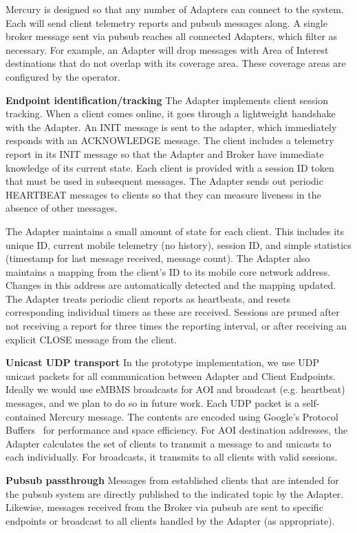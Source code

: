 Mercury is designed so that any number of Adapters can connect to the
\pubsub system. Each will send client telemetry reports and pubsub
messages along. A single broker message sent via pubsub reaches all
connected Adapters, which filter as necessary. For example, an Adapter
will drop messages with Area of Interest destinations that do not
overlap with its coverage area. These coverage areas are configured by
the operator.
  
\textbf{Endpoint identification/tracking} The Adapter implements
client session tracking. When a client comes online, it goes through a
lightweight handshake with the Adapter. An INIT message is sent to the
adapter, which immediately responds with an ACKNOWLEDGE message. The
client includes a telemetry report in its INIT message so that the
Adapter and Broker have immediate knowledge of its current state. Each
client is provided with a session ID token that must be used in
subsequent messages.  The Adapter sends out periodic HEARTBEAT
messages to clients so that they can measure liveness in the absence
of other messages.

The Adapter maintains a small amount of state for each client. This
includes its unique ID, current mobile telemetry (no history), session
ID, and simple statistics (timestamp for last message received,
message count). The Adapter also maintains a mapping from the client's
ID to its mobile core network address. Changes in this address are
automatically detected and the mapping updated. The Adapter treats
periodic client reports as heartbeats, and resets corresponding
individual timers as these are received. Sessions are pruned after not
receiving a report for three times the reporting interval, or after
receiving an explicit CLOSE message from the client.

\textbf{Unicast UDP transport} In the prototype implementation, we use
UDP unicast packets for all communication between Adapter and Client
Endpoints. Ideally we would use eMBMS broadcasts for AOI and broadcast
(e.g. heartbeat) messages, and we plan to do so in future work. Each
UDP packet is a self-contained Mercury message. The contents are
encoded using Google's Protocol Buffers~\cite{protocolbuffers} for
performance and space efficiency. For AOI destination addresses, the
Adapter calculates the set of clients to transmit a message to and
unicasts to each individually. For broadcasts, it transmits to all
clients with valid sessions.

\textbf{Pubsub passthrough} Messages from established clients that are
intended for the pubsub system are directly published to the indicated
topic by the Adapter. Likewise, messages received from the Broker via
pubsub are sent to specific endpoints or broadcast to all clients
handled by the Adapter (as appropriate).

